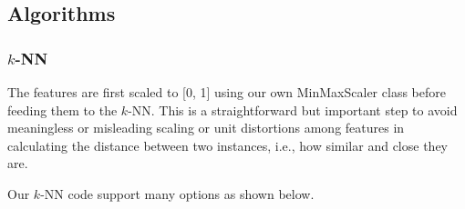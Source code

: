\subsection{Algorithms}

\subsubsection{$k$-NN}

The features are first scaled to [0, 1] using our own MinMaxScaler class before feeding them to the
$k$-NN.
This is a straightforward but important step to avoid meaningless or misleading scaling or unit
distortions among features in calculating the distance between two instances, i.e., how similar
and close they are.

Our $k$-NN code support many options as shown below.  

